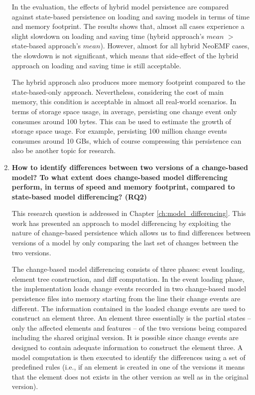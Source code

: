 \begin{enumerate}
  In the evaluation, the effects of hybrid model persistence are compared against state-based persistence on loading and saving models in terms of time and memory footprint. The results shows that, almost all cases experience a slight slowdown on loading and saving time (hybrid approach's $mean$ $>$ state-based approach's $mean$). However, almost for all hybrid NeoEMF cases, the slowdown is not significant, which means that side-effect of the hybrid approach on loading and saving time is still acceptable. 
  
  The hybrid approach also produces more memory footprint compared to the state-based-only approach. Nevertheless, considering the cost of main memory, this condition is acceptable in almost all real-world scenarios. In terms of storage space usage, in average, persisting one change event only consumes around 100 bytes. This can be used to estimate the growth of storage space usage. For example, persisting 100 million change events consumes around 10 GBs, which of course compressing this persistence can also be another topic for research.  
  
  \item \textbf{How to identify differences between two versions of a change-based model? To what extent does change-based model differencing perform, in terms of speed and memory footprint, compared to state-based model differencing? (RQ2)} 
  
 This research question is addressed in Chapter \ref{ch:model_differencing}.  This work has presented an approach to model differencing by exploiting the nature of change-based persistence which allows us to find differences between versions of a model by only comparing the last set of changes between the two versions.
 
 The change-based model differencing consists of three phases: event loading, element tree construction, and diff computation. In the event loading phase, the implementation loads change events recorded in two change-based model persistence files into memory starting from the line their change events are different. The information contained in the loaded change events are used to construct an element three. An element three essentially is the partial states -- only the affected elements and features -- of the two versions being compared including the shared original version. It is possible since change events are designed to contain adequate information to construct the element three. A model computation is then executed to identify the differences using a set of predefined rules (i.e., if an element is created in one of the versions it means that the element does not exists in the other version as well as in the original version).


\end{enumerate}

